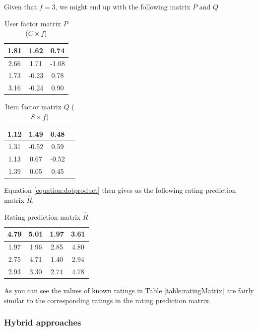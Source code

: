 Given that $f = 3$, we might end up with the following matrix $P$ and $Q$

\begin{table}[!htbp]
\centering
\begin{tabular}{|c|c|c|}
\hline
1.81    &1.62   &0.74\\ \hline
2.66    &1.71   &-1.08\\ \hline
1.73    &-0.23  &0.78\\ \hline
3.16    &-0.24  &0.90\\ \hline
\end{tabular}
\label{table:ItemFeature}
\caption{User factor matrix $P$ ($C \times f$)}
\end{table}

\begin{table}[!htbp]
\centering
\begin{tabular}{|c|c|c|c|}
\hline
1.12    &   1.49    &   0.48\\ \hline
1.31    &-0.52  &0.59\\ \hline
1.13    &0.67&  -0.52\\ \hline
1.39    &0.05&  0.45\\ \hline
\end{tabular}
\label{table:UserFeature}
\caption{Item factor matrix $Q$ ($S \times f$)}
\end{table}

Equation \ref{equation:dotproduct} then gives us the following rating prediction matrix $\hat{R}$.

\begin{table}[!htbp]
\centering
\begin{tabular}{|c|c|c|c|}
\hline
4.79    &5.01   &1.97   &3.61 \\ \hline
1.97    &1.96   &2.85   &4.80 \\ \hline
2.75    &4.71   &1.40   &2.94 \\ \hline
2.93    &3.30   &2.74   &4.78 \\ \hline
\end{tabular}
\label{table:PredictionMatrix}
\caption{Rating prediction matrix $\hat{R}$}
\end{table}

As you can see the values of known ratings in Table \ref{table:ratingMatrix}
are fairly similar to the corresponding ratings in the rating prediction
matrix.

\subsubsection{Hybrid approaches}

